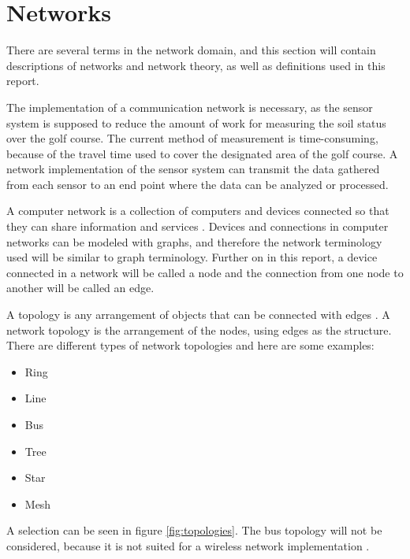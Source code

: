 \section{Networks}
There are several terms in the network domain, and this section will contain descriptions of networks and network theory, as well as definitions used in this report. 

The implementation of a communication network is necessary, as the sensor system is supposed to reduce the amount of work for measuring the soil status over the golf course. The current method of measurement is time-consuming, because of the travel time used to cover the designated area of the golf course. A network implementation of the sensor system can transmit the data gathered from each sensor to an end point where the data can be analyzed or processed.

A computer network is a collection of computers and devices connected so that they can share information and services \cite{mansfield2009computer}. Devices and connections in computer networks can be modeled with graphs, and therefore the network terminology used will be similar to graph terminology. Further on in this report, a device connected in a network will be called a node and the connection from one node to another will be called an edge.



A topology is any arrangement of objects that can be connected with edges \cite[p.~628]{discMath}. A network topology is the arrangement of the nodes, using edges as the structure. There are different types of network topologies and here are some examples:
\begin{itemize}
	\item Ring
	\item Line
	\item Bus
	\item Tree
	\item Star
	\item Mesh
\end{itemize}

A selection can be seen in figure \ref{fig:topologies}. The bus topology will not be considered, because it is not suited for a wireless network implementation \cite{re-find-it}. 

